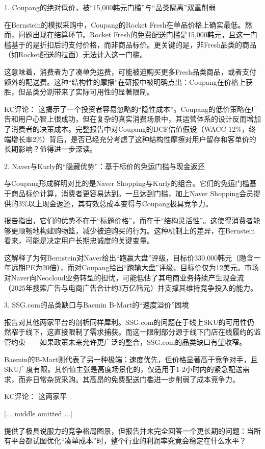 \documentclass[11pt]{ctexart}
\begin{document}
1. Coupang的绝对低价，被“15,000韩元门槛”与“品类隔离”双重削弱

在Bernstein的模拟采购中，Coupang的Rocket Fresh在单品价格上确实最低。然而，问题出现在结算环节。Rocket Fresh的免费配送门槛是15,000韩元，且这一门槛基于的是折扣后的支付价格，而非商品标价。更关键的是，非Fresh品类的商品（如Rocket配送的拉面）无法计入这一门槛。

这意味着，消费者为了凑单免运费，可能被迫购买更多Fresh品类商品，或者支付额外的配送费。这种“结构性的摩擦”在研报中被明确点出：Coupang在价格上获胜，但品类分割带来了实际可用性的显著限制。

KC评论： 这揭示了一个投资者容易忽略的“隐性成本”。Coupang的低价策略在广告和用户心智上很成功，但在复杂的真实消费场景中，其运营体系的设计反而增加了消费者的决策成本。完整报告中对Coupang的DCF估值假设（WACC 12\%，终端增长率2\%）背后，是否已经充分考虑了这种结构性摩擦对用户留存和客单价的长期影响？值得进一步深读。

2. Naver与Kurly的“隐藏优势”：基于标价的免运门槛与现金返还

与Coupang形成鲜明对比的是Naver Shopping与Kurly的组合。它们的免运门槛基于商品标价计算，消费者更容易达到。一旦达到门槛，加上Naver Shopping会员提供的3\%以上现金返还，其有效总成本变得与Coupang极具竞争力。

报告指出，它们的优势不在于“标题价格”，而在于“结构灵活性”。这使得消费者能够更顺畅地构建购物篮，减少被迫购买的行为。这种机制上的差异，在Bernstein看来，可能是决定用户长期忠诚度的关键变量。

这解释了为何Bernstein对Naver给出“跑赢大盘”评级，目标价330,000韩元（隐含一年远期PE为20倍），而对Coupang给出“跑输大盘”评级，目标价仅为12美元。市场对Naver向Neocloud业务转型的担忧，可能低估了其电商业务持续产生现金流（2025年搜索广告与电商广告合计约3万亿韩元）并支撑其维持竞争投入的能力。

3. SSG.com的品类缺口与Baemin B-Mart的“速度溢价”困境

报告对其他两家平台的剖析同样犀利。SSG.com的问题在于线上SKU的可用性仍然窄于线下，这直接限制了需求捕获。而这一限制部分源于线下门店在线履约的监管约束——如果政策未来允许更广泛的整合，SSG.com的品类缺口有望收窄。

Baemin的B-Mart则代表了另一种极端：速度优先，但价格显著高于竞争对手，且SKU广度有限。其价值主张是高度场景化的，仅适用于1-2小时内的紧急配送需求，而非日常杂货采购。其高昂的免费配送门槛进一步削弱了成本竞争力。

KC评论： 这两家平

[... middle omitted ...]

提供了极具说服力的竞争格局图景，但报告并未完全回答一个更长期的问题：当所有平台都试图优化“凑单成本”时，整个行业的利润率究竟会稳定在什么水平？
\end{document}
